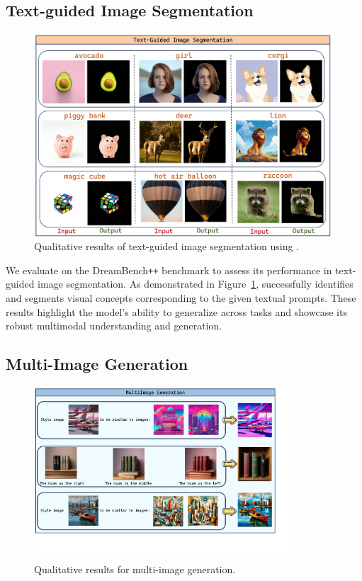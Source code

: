 \subsection{Text-guided Image Segmentation}
\label{sec:Segmentation}


\begin{figure}[t]
\centering
\includegraphics[width=1.0\textwidth]{figures/segmentation_example.pdf}
\caption{Qualitative results of text-guided image segmentation using \model.}
\label{fig:segmentation_example}
\end{figure}

We evaluate \model on the DreamBench\texttt{++} benchmark to assess its performance in text-guided image segmentation. As demonstrated in Figure~\ref{fig:segmentation_example}, \model successfully identifies and segments visual concepts corresponding to the given textual prompts. These results highlight the model's ability to generalize across tasks and showcase its robust multimodal understanding and generation.

\subsection{Multi-Image Generation}
\label{sec:Multi-Image}

\begin{figure}[t]
\centering
\includegraphics[width=0.85\textwidth]{figures/multi_img.pdf}
\caption{Qualitative results for multi-image generation.}
\label{fig:multi_image}
\end{figure}

